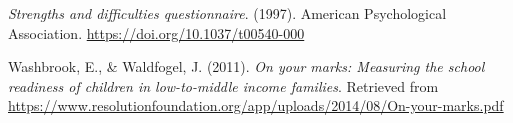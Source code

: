 \documentclass[
  english,
  man]{apa6}
\newlength{\cslhangindent}
\newenvironment{cslreferences}%
  {\setlength{\parindent}{0pt}%
  \everypar{\setlength{\hangindent}{\cslhangindent}}\ignorespaces}%
  {\par}
\begin{document}
\begin{cslreferences}
\leavevmode\hypertarget{ref-goodman1997}{}%
\emph{Strengths and difficulties questionnaire}. (1997). American Psychological Association. \url{https://doi.org/10.1037/t00540-000}

\leavevmode\hypertarget{ref-washbrook2011}{}%
Washbrook, E., \& Waldfogel, J. (2011). \emph{On your marks: Measuring the school readiness of children in low-to-middle income families}. Retrieved from \url{https://www.resolutionfoundation.org/app/uploads/2014/08/On-your-marks.pdf}
\end{cslreferences}

\endgroup
\end{document}
